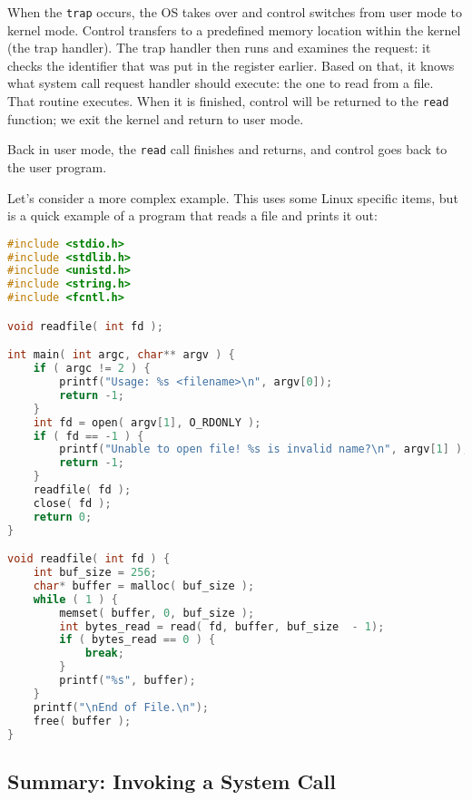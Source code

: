 When the \texttt{trap} occurs, the OS takes over and control switches from user mode to kernel mode. Control transfers to a predefined memory location within the kernel (the trap handler). The trap handler then runs and examines the request: it checks the identifier that was put in the register earlier. Based on that, it knows what system call request handler should execute: the one to read from a file. That routine executes. When it is finished, control will be returned to the \texttt{read} function; we exit the kernel and return to user mode.

Back in user mode, the \texttt{read} call finishes and returns, and control goes back to the user program.

Let's consider a more complex example. This uses some Linux specific items, but is a quick example of a program that reads a file and prints it out:

\begin{lstlisting}[language=C]
#include <stdio.h>
#include <stdlib.h>
#include <unistd.h>
#include <string.h>
#include <fcntl.h>

void readfile( int fd );

int main( int argc, char** argv ) {
    if ( argc != 2 ) {
        printf("Usage: %s <filename>\n", argv[0]);
        return -1;
    }
    int fd = open( argv[1], O_RDONLY );
    if ( fd == -1 ) {
        printf("Unable to open file! %s is invalid name?\n", argv[1] );
        return -1;
    }
    readfile( fd );
    close( fd );
    return 0;
}

void readfile( int fd ) {
    int buf_size = 256;
    char* buffer = malloc( buf_size );
    while ( 1 ) {
        memset( buffer, 0, buf_size );
        int bytes_read = read( fd, buffer, buf_size  - 1);  
        if ( bytes_read == 0 ) {
            break; 
        }     
        printf("%s", buffer);
    }
    printf("\nEnd of File.\n");
    free( buffer );
}
\end{lstlisting}


\subsection*{Summary: Invoking a System Call}

